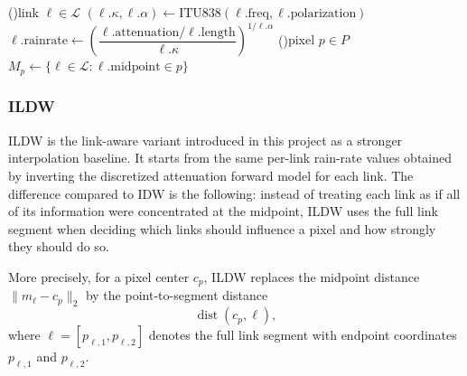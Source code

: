 \documentclass[11pt]{article}
\begin{document}
\begin{algorithm}[H]
    \caption{Discretized IDW. Each link is replaced with a virtual gauge located at the midpoint of the link. The rain rate at the gauge is set to the uniform rain rate that reproduces the input link attenuation under ITU-R P.838-3. IDW is then applied with respect to these virtual gauges. We set the exponent of the decay to $2$. }
    \DontPrintSemicolon
\ForEach(){link $\ell \in \mathcal{L}$}{%
    $(\ell.\kappa,\ell.\alpha) \gets \mathrm{ITU838}(\ell.\mathrm{freq},\ell.\mathrm{polarization})$\;
    $\ell.\mathrm{rainrate} \gets \left(\dfrac{\ell.\mathrm{attenuation}/\ell.\mathrm{length}}{\ell.\kappa}\right)^{1/\ell.\alpha}$\;
}
   \ForEach(){pixel $p \in {P}$}{
        $M_p \gets \{\ell \in \mathcal{L} : \ell.\mathrm{midpoint} \in p\}$\;
    }
\end{algorithm}


\subsubsection{ILDW}
ILDW is the link-aware variant introduced in this project as a stronger interpolation baseline. It starts from the same per-link rain-rate values obtained by inverting the discretized attenuation forward model for each link. The difference compared to IDW is the following: instead of treating each link as if all of its information were concentrated at the midpoint, ILDW uses the full link segment when deciding which links should influence a pixel and how strongly they should do so.

More precisely, for a pixel center $c_p$, ILDW replaces the midpoint distance $\|m_\ell-c_p\|_2$ by the point-to-segment distance
\[
\operatorname{dist}(c_p,\ell),
\]
where $\ell=[p_{\ell,1},p_{\ell,2}]$ denotes the full link segment with endpoint coordinates $p_{\ell,1}$ and $p_{\ell,2}$.
\end{document}
